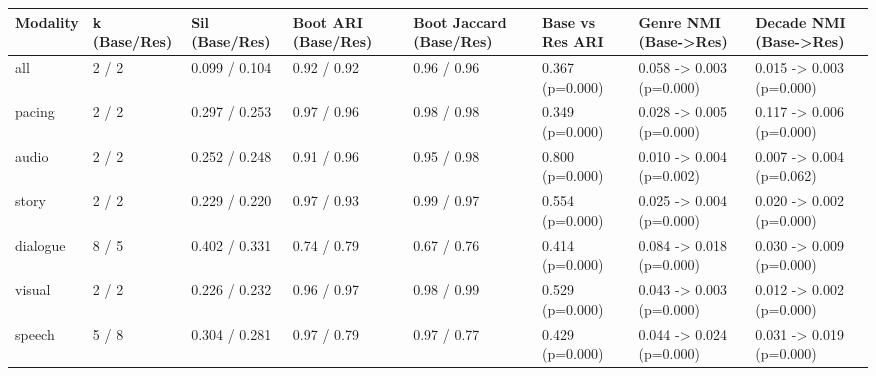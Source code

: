 \begin{tabular}{llllllll}
\toprule
Modality & k (Base/Res) & Sil (Base/Res) & Boot ARI (Base/Res) & Boot Jaccard (Base/Res) & Base vs Res ARI & Genre NMI (Base->Res) & Decade NMI (Base->Res) \\
\midrule
all & 2 / 2 & 0.099 / 0.104 & 0.92 / 0.92 & 0.96 / 0.96 & 0.367 (p=0.000) & 0.058 -> 0.003 (p=0.000) & 0.015 -> 0.003 (p=0.000) \\
pacing & 2 / 2 & 0.297 / 0.253 & 0.97 / 0.96 & 0.98 / 0.98 & 0.349 (p=0.000) & 0.028 -> 0.005 (p=0.000) & 0.117 -> 0.006 (p=0.000) \\
audio & 2 / 2 & 0.252 / 0.248 & 0.91 / 0.96 & 0.95 / 0.98 & 0.800 (p=0.000) & 0.010 -> 0.004 (p=0.002) & 0.007 -> 0.004 (p=0.062) \\
story & 2 / 2 & 0.229 / 0.220 & 0.97 / 0.93 & 0.99 / 0.97 & 0.554 (p=0.000) & 0.025 -> 0.004 (p=0.000) & 0.020 -> 0.002 (p=0.000) \\
dialogue & 8 / 5 & 0.402 / 0.331 & 0.74 / 0.79 & 0.67 / 0.76 & 0.414 (p=0.000) & 0.084 -> 0.018 (p=0.000) & 0.030 -> 0.009 (p=0.000) \\
visual & 2 / 2 & 0.226 / 0.232 & 0.96 / 0.97 & 0.98 / 0.99 & 0.529 (p=0.000) & 0.043 -> 0.003 (p=0.000) & 0.012 -> 0.002 (p=0.000) \\
speech & 5 / 8 & 0.304 / 0.281 & 0.97 / 0.79 & 0.97 / 0.77 & 0.429 (p=0.000) & 0.044 -> 0.024 (p=0.000) & 0.031 -> 0.019 (p=0.000) \\
\bottomrule
\end{tabular}
